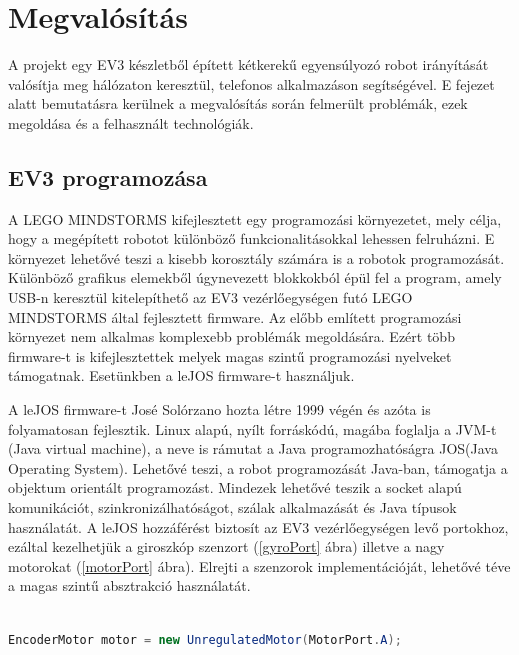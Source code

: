\chapter{Megvalósítás}\label{ch:MEGVALOSITAS}
\begin{osszefoglal}
	A projekt egy EV3 készletből épített kétkerekű egyensúlyozó robot irányítását valósítja meg hálózaton keresztül, telefonos alkalmazáson segítségével. E fejezet alatt bemutatásra kerülnek a megvalósítás során felmerült problémák, ezek megoldása és a felhasznált technológiák.
\end{osszefoglal}

\section{EV3 programozása}\label{sec:MEGVALOSITAS:lejos}
A LEGO MINDSTORMS kifejlesztett egy programozási környezetet, mely célja, hogy a megépített robotot különböző funkcionalitásokkal lehessen felruházni. E környezet lehetővé teszi a kisebb korosztály számára is a robotok programozását. Különböző grafikus elemekből úgynevezett blokkokból épül fel a program, amely USB-n keresztül kitelepíthető az EV3 vezérlőegységen futó LEGO MINDSTORMS által fejlesztett firmware.
Az előbb említett programozási környezet nem alkalmas komplexebb problémák megoldására. Ezért több firmware-t is kifejlesztettek melyek magas szintű programozási nyelveket támogatnak. Esetünkben a leJOS firmware-t használjuk.

A leJOS firmware-t José Solórzano hozta létre 1999 végén és azóta is folyamatosan fejlesztik. Linux alapú, nyílt forráskódú, magába foglalja a JVM-t (Java virtual machine), a neve is rámutat a Java programozhatóságra JOS(Java Operating System). Lehetővé teszi, a robot programozását Java-ban, támogatja a objektum orientált programozást. Mindezek lehetővé teszik a socket alapú komunikációt, szinkronizálhatóságot, szálak alkalmazását és Java típusok használatát. A leJOS hozzáférést biztosít az EV3 vezérlőegységen levő portokhoz, ezáltal kezelhetjük a giroszkóp szenzort (\ref{gyroPort} ábra) illetve a nagy motorokat (\ref{motorPort} ábra). Elrejti a szenzorok implementációját, lehetővé téve a magas szintű absztrakció használatát.

\begin{lstlisting}[label=motorPort, caption= Az \texttt{A} porton keresztül hozzáférés a motorhoz, language=Java]

EncoderMotor motor = new UnregulatedMotor(MotorPort.A);

\end{lstlisting}

